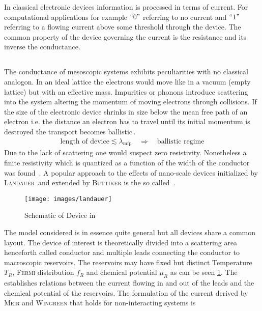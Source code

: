 In classical electronic devices information is processed in terms of current. For computational applications for example $``0"$ referring to no current and $``1"$ referring to a flowing current above some threshold through the device. The common property of the device governing the current is the resistance and its inverse the conductance.
\subsection{\clanbform{}}\label{sec:landauerbuettiker}
The conductance of mesoscopic systems exhibits peculiarities with no classical analogon.  
In an ideal lattice the electrons would move like in a vacuum (empty lattice) but with an effective mass. Impurities or phonons introduce scattering into the system altering the momentum of moving electrons through collisions.
If the size of the electronic device shrinks in size below the mean free path of an electron i.e. the distance an electron has to travel until its initial momentum is destroyed the transport becomes ballistic\,\cite{datta1989quantum}. 
\begin{align}
	\text{length of device} \lesssim \lambda_{\text{mfp}}\quad \Rightarrow \quad\text{ballistic regime}
	\label{eqn:meanfreepath}
\end{align}
Due to the lack of scattering one would suspect zero resistivity. Nonetheless a finite resistivity which is quantized as a function of the width of the conductor was found \,\cite{PhysRevLett.60.848}.
A popular approach to the effects of nano-scale devices initialized by \textsc{Landauer}\,\cite{PhilMag.21.863} and extended by \textsc{B\"uttiker} is the so called \lanbform{}\,\cite{PhysRevB.31.6207}.  
\begin{figure}[h]
\centering
\texttt{[image: images/landauer]} 
\caption{Schematic of Device in \lanbform{}}
\label{fig:lanbform}
\end{figure}
The model considered is in essence quite general but all devices share a common layout. The device of interest is theoretically divided into a scattering area henceforth called conductor and multiple leads connecting the conductor to macroscopic reservoirs. The reservoirs may have fixed but distinct Temperature $T_R$, \textsc{Fermi} distribution $f_R$ and chemical potential $\mu_R$ as can be seen \cref{fig:lanbform}.
The \lanbform{} establishes relations between the current flowing in and out of the leads and the chemical potential of the reservoirs. The formulation of the current derived by \textsc{Meir} and \textsc{Wingreen}\cite{PhysRevLett.68.2512} that holds for non-interacting systems is
